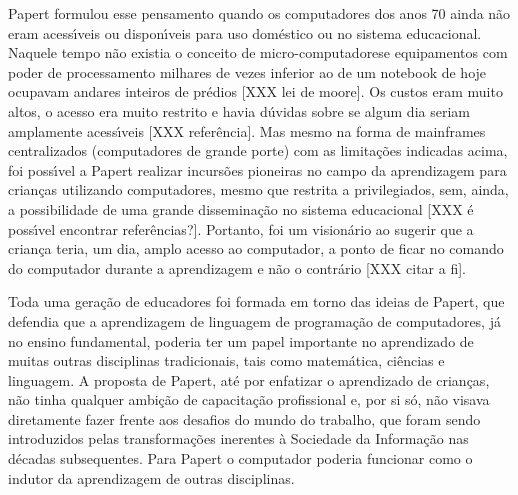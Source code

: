\documentclass[
12pt,		%
openright,	%
twoside,  %
a4paper,			%
chapter=TITLE,		%
english,			%
french,				%
spanish,			%
brazil				%
]{USPSC-classe/USPSC_RedarTex}
\begin{document}
\noindent\begin{center}\mbox{\centering{}}\end{center}


Papert formulou esse pensamento quando os computadores dos anos 70 ainda n\~ao eram acess\'{\i}veis ou dispon\'{\i}veis para uso dom\'estico ou no sistema educacional. Naquele tempo n\~ao existia o conceito de \textquotedbl micro-computadores\textquotedbl  e equipamentos com poder de processamento milhares de vezes inferior ao de um notebook de hoje ocupavam andares inteiros de pr\'edios [XXX lei de moore]. Os custos eram muito altos, o acesso era muito restrito e havia d\'uvidas sobre se algum dia seriam amplamente acess\'{\i}veis [XXX refer\^encia]. Mas mesmo na forma de mainframes centralizados (computadores de grande porte) com as limita\c{c}\~oes indicadas acima, foi poss\'{\i}vel a Papert realizar incurs\~oes pioneiras no campo da aprendizagem para crian\c{c}as utilizando computadores, mesmo que restrita a privilegiados, sem, ainda, a possibilidade de uma grande dissemina\c{c}\~ao no sistema educacional [XXX \'e poss\'{\i}vel encontrar refer\^encias?].  Portanto, foi um vision\'ario ao sugerir que a crian\c{c}a teria, um dia, amplo acesso ao computador, a ponto de ficar no comando do computador durante a aprendizagem e n\~ao o contr\'ario [XXX citar a fi].










Toda uma gera\c{c}\~ao de educadores foi formada em torno das ideias de Papert, que defendia que a aprendizagem de linguagem de programa\c{c}\~ao de computadores, j\'a no ensino fundamental, poderia ter um papel importante no aprendizado de muitas outras disciplinas tradicionais, tais como matem\'atica, ci\^encias e linguagem. A proposta de Papert, at\'e por enfatizar o aprendizado de crian\c{c}as, n\~ao tinha qualquer ambi\c{c}\~ao de capacita\c{c}\~ao profissional e, por si s\'o, n\~ao visava diretamente fazer frente aos desafios do \textquotedbl mundo do trabalho\textquotedbl , que foram sendo introduzidos pelas transforma\c{c}\~oes inerentes \`a Sociedade da Informa\c{c}\~ao nas d\'ecadas subsequentes. Para Papert o computador poderia funcionar como o indutor da aprendizagem de outras disciplinas.
\end{document}
